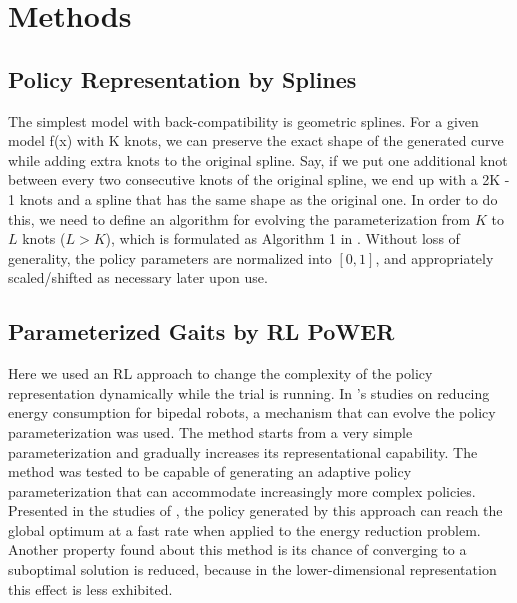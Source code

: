 \section{Methods}

\subsection{Policy Representation by Splines}
The simplest model with back-compatibility is geometric
splines.  For a given model f(x) with K knots, we can preserve the
exact shape of the generated curve while adding extra knots to the
original spline. Say, if we put one additional knot between every two
consecutive knots of the original spline, we end up with a 2K - 1
knots and a spline that has the same shape as the original one. In
order to do this, we need to define an algorithm for evolving the
parameterization from $K$ to $L$ knots ($L > K$), which is formulated as 
Algorithm 1 in \cite{kormushev2011bipedal-walking-energy} .  Without loss of generality, the policy parameters are
normalized into $[0, 1]$, and appropriately scaled/shifted as necessary
later upon use.

\subsection{Parameterized Gaits by RL PoWER}

Here we used an RL approach to change the complexity of the policy
representation dynamically while the trial is running. In
\cite{kormushev2011bipedal-walking-energy}'s studies on reducing energy
consumption for bipedal robots, a mechanism that can
evolve the policy parameterization was used. The method starts from a
very simple parameterization and gradually increases its
representational capability. The method was tested to be capable of generating
an adaptive policy parameterization that can accommodate increasingly
more complex policies. Presented in the studies of \cite{kormushev2011bipedal-walking-energy}, the policy
generated by this approach can reach the global optimum at a fast
rate when applied to the energy reduction problem. Another property found about this method is its chance of converging to a suboptimal solution is reduced, because in the lower-dimensional representation this effect is less exhibited.


